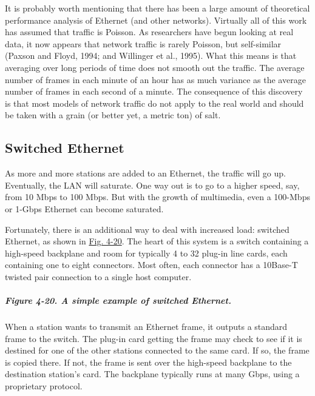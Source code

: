\documentclass[b5paper,11pt]{memoir}
\begin{document}
It is probably worth mentioning that there has been a large amount of
theoretical performance analysis of Ethernet (and other networks).
Virtually all of this work has assumed that traffic is Poisson. As
researchers have begun looking at real data, it now appears that network
traffic is rarely Poisson, but self-similar (Paxson and Floyd, 1994; and
Willinger et al., 1995). What this means is that averaging over long
periods of time does not smooth out the traffic. The average number of
frames in each minute of an hour has as much variance as the average
number of frames in each second of a minute. The consequence of this
discovery is that most models of network traffic do not apply to the
real world and should be taken with a grain (or better yet, a metric
ton) of salt.

\protect\hypertarget{0130661023_ch04lev1sec3.htmlux5cux23ch04lev2sec14}{}{}

\subsection{Switched Ethernet}

As more and more stations are added to an Ethernet, the traffic will go
up. Eventually, the LAN will saturate. One way out is to go to a higher
speed, say, from 10 Mbps to 100 Mbps. But with the growth of multimedia,
even a 100-Mbps or 1-Gbps Ethernet can become saturated.

Fortunately, there is an additional way to deal with increased load:
switched Ethernet, as shown in
\protect\hyperlink{0130661023_ch04lev1sec3.htmlux5cux23ch04fig20}{Fig.
4-20}. The heart of this system is a {switch} containing a high-speed
backplane and room for typically 4 to 32 plug-in line cards, each
containing one to eight connectors. Most often, each connector has a
10Base-T twisted pair connection to a single host computer.

\subparagraph[Figure 4-20. A simple example of switched
Ethernet.]{\texorpdfstring{\protect\hypertarget{0130661023_ch04lev1sec3.htmlux5cux23ch04fig20}{}{}Figure
4-20. A simple example of switched
Ethernet.}{Figure 4-20. A simple example of switched Ethernet.}}


When a station wants to transmit an Ethernet frame, it outputs a
standard frame to the switch. The plug-in card getting the frame may
check to see if it is destined for one of the other stations connected
to the same card. If so, the frame is copied there. If not, the frame is
sent over the high-speed backplane to the destination station's card.
The backplane typically runs at many Gbps, using a proprietary protocol.
\end{document}
